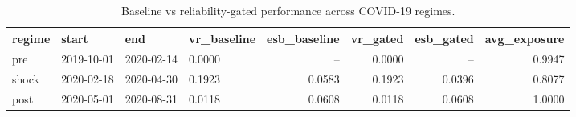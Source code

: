 \begin{table}[t]
\centering
\small
\begin{tabular}{llllrrrr}
\toprule
regime & start & end & vr_baseline & esb_baseline & vr_gated & esb_gated & avg_exposure \\
\midrule
pre & 2019-10-01 & 2020-02-14 & 0.0000 & -- & 0.0000 & -- & 0.9947 \\
shock & 2020-02-18 & 2020-04-30 & 0.1923 & 0.0583 & 0.1923 & 0.0396 & 0.8077 \\
post & 2020-05-01 & 2020-08-31 & 0.0118 & 0.0608 & 0.0118 & 0.0608 & 1.0000 \\
\bottomrule
\end{tabular}
\caption{Baseline vs reliability-gated performance across COVID-19 regimes.}
\label{tab:covid}
\end{table}
